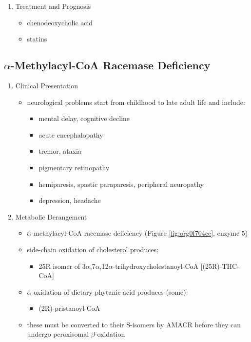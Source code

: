 \documentclass[12pt]{scrartcl}
\begin{document}
\begin{enumerate}
\item Treatment and Prognosis
\label{sec:org638a175}
\begin{itemize}
\item chenodeoxycholic acid
\item statins
\end{itemize}
\end{enumerate}
\subsection{\(\alpha\)-Methylacyl-CoA Racemase Deficiency}
\label{sec:orge8beb2c}
\begin{enumerate}
\item Clinical Presentation
\label{sec:org0a111bc}
\begin{itemize}
\item neurological problems start from childhood to late adult life and
include:
\begin{itemize}
\item mental delay, cognitive decline
\item acute encephalopathy
\item tremor, ataxia
\item pigmentary retinopathy
\item hemiparesis, spastic paraparesis, peripheral neuropathy
\item depression, headache
\end{itemize}
\end{itemize}

\item Metabolic Derangement
\label{sec:orga7a664b}
\begin{itemize}
\item \(\alpha\)-methylacyl-CoA racemase deficiency (Figure \ref{fig:org0f704ce}, enzyme 5)
\item side-chain oxidation of cholesterol produces:
\begin{itemize}
\item 25R isomer of 3\(\alpha\),7\(\alpha\),12\(\alpha\)-trihydroxycholestanoyl-CoA [(25R)-THC-CoA]
\end{itemize}
\item \(\alpha\)-oxidation of dietary phytanic acid produces (some):
\begin{itemize}
\item (2R)-pristanoyl-CoA
\end{itemize}
\item these must be converted to their S-isomers by AMACR before they can
undergo peroxisomal \(\beta\)-oxidation
\end{itemize}


\end{enumerate}
\end{document}

